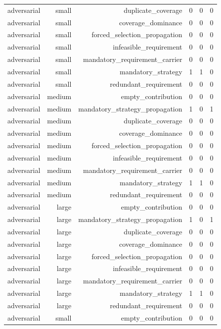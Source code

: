 {\begin{longtable}{lrrrrr}
adversarial & small & duplicate\_coverage & 0 & 0 & 0 \\
adversarial & small & coverage\_dominance & 0 & 0 & 0 \\
adversarial & small & forced\_selection\_propagation & 0 & 0 & 0 \\
adversarial & small & infeasible\_requirement & 0 & 0 & 0 \\
adversarial & small & mandatory\_requirement\_carrier & 0 & 0 & 0 \\
adversarial & small & mandatory\_strategy & 1 & 1 & 0 \\
adversarial & small & redundant\_requirement & 0 & 0 & 0 \\
adversarial & medium & empty\_contribution & 0 & 0 & 0 \\
adversarial & medium & mandatory\_strategy\_propagation & 1 & 0 & 1 \\
adversarial & medium & duplicate\_coverage & 0 & 0 & 0 \\
adversarial & medium & coverage\_dominance & 0 & 0 & 0 \\
adversarial & medium & forced\_selection\_propagation & 0 & 0 & 0 \\
adversarial & medium & infeasible\_requirement & 0 & 0 & 0 \\
adversarial & medium & mandatory\_requirement\_carrier & 0 & 0 & 0 \\
adversarial & medium & mandatory\_strategy & 1 & 1 & 0 \\
adversarial & medium & redundant\_requirement & 0 & 0 & 0 \\
adversarial & large & empty\_contribution & 0 & 0 & 0 \\
adversarial & large & mandatory\_strategy\_propagation & 1 & 0 & 1 \\
adversarial & large & duplicate\_coverage & 0 & 0 & 0 \\
adversarial & large & coverage\_dominance & 0 & 0 & 0 \\
adversarial & large & forced\_selection\_propagation & 0 & 0 & 0 \\
adversarial & large & infeasible\_requirement & 0 & 0 & 0 \\
adversarial & large & mandatory\_requirement\_carrier & 0 & 0 & 0 \\
adversarial & large & mandatory\_strategy & 1 & 1 & 0 \\
adversarial & large & redundant\_requirement & 0 & 0 & 0 \\
adversarial & small & empty\_contribution & 0 & 0 & 0 \\

\end{longtable}}
